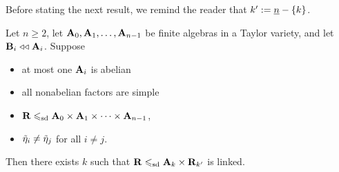   Before stating the next result, we remind the reader that 
  $k' := \underline{n}-\{k\}$.
  \begin{lemma}
    \label{lem:Link-2}
    Let $n\geq 2$, let $\mathbf{A}_0, \mathbf{A}_1, \dots, \mathbf{A}_{n-1}$ be finite algebras in a
    Taylor variety, and let $\mathbf{B}_i \mathrel{\triangleleft\triangleleft} \mathbf{A}_i$. Suppose
    \begin{itemize}
    \item at most one $\mathbf{A}_i$ is abelian
    \item all nonabelian factors are simple
    \item $\mathbf{R} \leqslant_{\mathrm{sd}} \mathbf{A}_0 \times \mathbf{A}_1 \times \cdots \times \mathbf{A}_{n-1}$,
    \item $\tilde{\eta}_i \neq \tilde{\eta}_j$ for all $i\neq j$. %
    \end{itemize}
    Then there exists %
    $k$ such that $\mathbf{R}\leqslant_{\mathrm{sd}} \mathbf{A}_k \times \mathbf{R}_{k'}$ is linked.
  \end{lemma}
